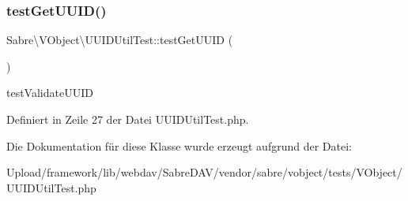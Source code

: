 \subsubsection{\texorpdfstring{test\+Get\+U\+U\+I\+D()}{testGetUUID()}}
{\footnotesize\ttfamily Sabre\textbackslash{}\+V\+Object\textbackslash{}\+U\+U\+I\+D\+Util\+Test\+::test\+Get\+U\+U\+ID (\begin{DoxyParamCaption}{ }\end{DoxyParamCaption})}

test\+Validate\+U\+U\+ID 

Definiert in Zeile 27 der Datei U\+U\+I\+D\+Util\+Test.\+php.



Die Dokumentation für diese Klasse wurde erzeugt aufgrund der Datei\+:\begin{DoxyCompactItemize}
\item 
Upload/framework/lib/webdav/\+Sabre\+D\+A\+V/vendor/sabre/vobject/tests/\+V\+Object/U\+U\+I\+D\+Util\+Test.\+php\end{DoxyCompactItemize}
